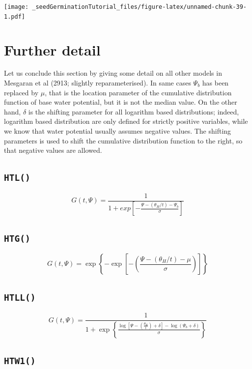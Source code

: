 \documentclass[
]{book}
\begin{document}
\texttt{[image: \_seedGerminationTutorial\_files/figure-latex/unnamed-chunk-39-1.pdf]}

\hypertarget{further-detail}{%
\section{Further detail}\label{further-detail}}

Let us conclude this section by giving some detail on all other models in Mesgaran et al (2913; slightly reparameterised). In same cases \(\Psi_b\) has been replaced by \(\mu\), that is the location parameter of the cumulative distribution function of base water potential, but it is not the median value. On the other hand, \(\delta\) is the shifting parameter for all logarithm based distributions; indeed, logarithm based distribution are only defined for strictly positive variables, while we know that water potential usually assumes negative values. The shifting parameters is used to shift the cumulative distribution function to the right, so that negative values are allowed.

\hypertarget{htl}{%
\subsection{\texorpdfstring{\texttt{HTL()}}{HTL()}}\label{htl}}

\[ G(t, \Psi) = \frac{1}{1 + exp \left[ - \frac{  \Psi  - \left( \theta _H/t \right) - \Psi_{b} } {\sigma}  \right] }\]

\hypertarget{htg}{%
\subsection{\texorpdfstring{\texttt{HTG()}}{HTG()}}\label{htg}}

\[ G(t, \Psi) = \exp \left\{ { - \exp \left[ { - \left( {\frac{{\Psi - (\theta _H / t ) - \mu }}{\sigma }} \right)} \right]} \right\} \]

\hypertarget{htll}{%
\subsection{\texorpdfstring{\texttt{HTLL()}}{HTLL()}}\label{htll}}

\[ G(t, \Psi) = \frac{1}{1 + \exp \left\{ \frac{ \log \left[ \Psi  - \left( \frac{\theta _H}{t} \right) + \delta \right] - \log(\Psi_{b} + \delta)  }{\sigma}\right\} }\]

\hypertarget{htw1}{%
\subsection{\texorpdfstring{\texttt{HTW1()}}{HTW1()}}\label{htw1}}
\end{document}
